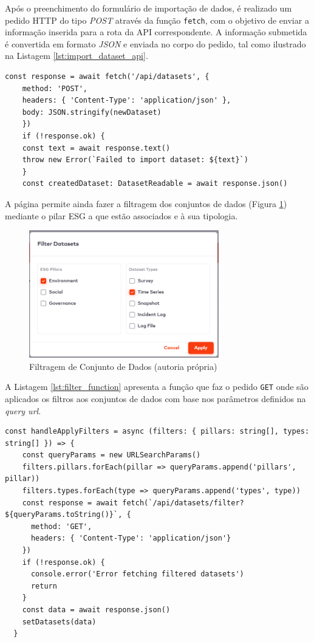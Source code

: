 Após o preenchimento do formulário de importação de dados, é realizado um pedido HTTP do tipo \textit{POST} através da função \texttt{fetch}, com o objetivo de enviar a informação inserida para a rota da API correspondente. A informação submetida é convertida em formato \textit{JSON} e enviada no corpo do pedido, tal como ilustrado na Listagem \ref{lst:import_dataset_api}.

\newpage

\begin{lstlisting}[style=customts, caption={Chamada à API de Importação de um Conjunto de Dados}, label={lst:import_dataset_api}]
    const response = await fetch('/api/datasets', {
    method: 'POST',
    headers: { 'Content-Type': 'application/json' },
    body: JSON.stringify(newDataset)
    })
    if (!response.ok) {
    const text = await response.text()
    throw new Error(`Failed to import dataset: ${text}`)
    }
    const createdDataset: DatasetReadable = await response.json()
\end{lstlisting}

A página permite ainda fazer a filtragem dos conjuntos de dados (Figura \ref{fig:dataset_filter}) mediante o pilar ESG a que estão associados e à sua tipologia.

\begin{figure}[H]
    \centering
    \includegraphics[width=3.25in,keepaspectratio]{frontmatter/assets/platform_prints/dataset/dataset_filter.png}
    \caption{Filtragem de Conjunto de Dados (autoria própria)}
    \label{fig:dataset_filter}
\end{figure}

A Listagem \ref{lst:filter_function} apresenta a função que faz o pedido \texttt{GET} onde são aplicados os filtros aos conjuntos de dados com base nos parâmetros definidos na \textit{query url}.

\begin{lstlisting}[style=customts, caption={Função de Filtragem de Conjunto de Dados}, label={lst:filter_function}]
const handleApplyFilters = async (filters: { pillars: string[], types: string[] }) => {
    const queryParams = new URLSearchParams()
    filters.pillars.forEach(pillar => queryParams.append('pillars', pillar))
    filters.types.forEach(type => queryParams.append('types', type))
    const response = await fetch(`/api/datasets/filter?${queryParams.toString()}`, {
      method: 'GET',
      headers: { 'Content-Type': 'application/json'}
    })
    if (!response.ok) {
      console.error('Error fetching filtered datasets')
      return
    }
    const data = await response.json()
    setDatasets(data)
  }
\end{lstlisting}


